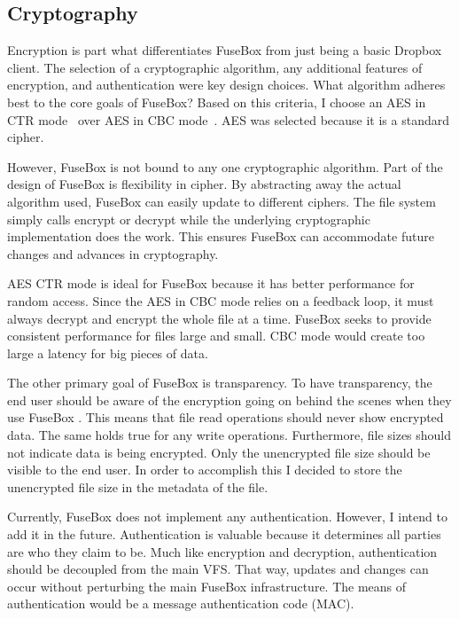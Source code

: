 \documentclass[11pt,twocolumn,letterpaper]{article}
\newcommand{\appname}{FuseBox }
\newcommand{\appnameWOspace}{FuseBox}
\begin{document}
\subsection{Cryptography}
\label{sec:enc}
Encryption is part what differentiates \appname from just being a basic
Dropbox client. The selection of a cryptographic algorithm,
any additional features of encryption, and authentication were key design choices. What
algorithm adheres best to the core goals of \appnameWOspace? Based on
this criteria, I choose an AES in CTR mode~\cite{AESCTR} over AES in
CBC mode~\cite{CBC}. AES was selected because it is a standard cipher. 
\par However, \appname is not bound to any one cryptographic algorithm. 
Part of the design of \appname is
flexibility in cipher. By abstracting away the actual algorithm used,
\appname can easily update to different ciphers. The file system
simply calls encrypt or decrypt while the underlying cryptographic
implementation does the work. This ensures \appname can accommodate 
future changes and advances in cryptography. 
\par AES CTR mode is ideal for \appname because it has better
performance for random access. Since the AES in CBC mode relies on a 
feedback loop, it must always decrypt and encrypt
the whole file at a time. \appname seeks to provide consistent
performance for files large and small. CBC mode would create
too large a latency for big pieces of data.   
\par The other primary goal of \appname is transparency. To have
transparency, the end user should be aware of the encryption going on
behind the scenes when they use \appname. This means that file read
operations should never show encrypted data. The same holds true for
any write operations. Furthermore, file sizes should not indicate 
data is being encrypted. Only the unencrypted file size should be
visible to the end user. In order to
accomplish this I decided to store the unencrypted file size in the
metadata of the file. 
\par Currently, \appname does not implement any
authentication. However, I intend to add it in the future. Authentication is
valuable because it determines all parties are who they claim to
be. Much like encryption and decryption, authentication should be
decoupled from the main VFS. That way, updates and changes 
can occur without perturbing the main \appname infrastructure. The
means of authentication would be a message authentication code (MAC).  
\end{document}
